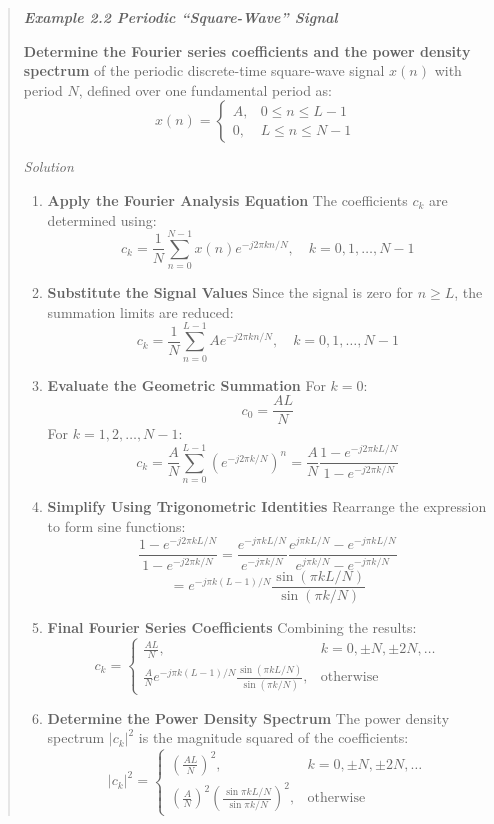 \begin{quote}
\textbf{\emph{Example 2.2 Periodic ``Square-Wave'' Signal}}

\textbf{Determine the Fourier series coefficients and the power density
spectrum} of the periodic discrete-time square-wave signal \(x(n)\) with
period \(N\), defined over one fundamental period as:
\[x(n) = \begin{cases} A, & 0 \leq n \leq L-1 \\ 0, & L \leq n \leq N-1 \end{cases}\]

\emph{Solution}

\begin{enumerate}
\def\labelenumi{\arabic{enumi}.}
\item
  \textbf{Apply the Fourier Analysis Equation} The coefficients \(c_k\)
  are determined using:
  \[c_k = \frac{1}{N} \sum_{n=0}^{N-1} x(n)e^{-j2\pi kn/N}, \quad k = 0, 1, \dots, N-1\]
\item
  \textbf{Substitute the Signal Values} Since the signal is zero for
  \(n \geq L\), the summation limits are reduced:
  \[c_k = \frac{1}{N} \sum_{n=0}^{L-1} Ae^{-j2\pi kn/N}, \quad k = 0, 1, \dots, N-1\]
\item
  \textbf{Evaluate the Geometric Summation} For \(k=0\):
  \[c_0 = \frac{AL}{N}\] For \(k = 1, 2, \dots, N-1\):
  \[c_k = \frac{A}{N} \sum_{n=0}^{L-1} (e^{-j2\pi k/N})^n = \frac{A}{N} \frac{1- e^{-j2\pi kL/N}}{1- e^{-j2\pi k/N}}\]
\item
  \textbf{Simplify Using Trigonometric Identities} Rearrange the
  expression to form sine functions:
  \[\frac{1- e^{-j2\pi kL/N}}{1- e^{-j2\pi k/N}} = \frac{e^{-j\pi kL/N}}{e^{-j\pi k/N}} \frac{e^{j\pi kL/N} - e^{-j\pi kL/N}}{e^{j\pi k/N} - e^{-j\pi k/N}}\]
  \[= e^{-j\pi k(L-1)/N} \frac{\sin(\pi kL/N)}{\sin(\pi k/N)}\]
\item
  \textbf{Final Fourier Series Coefficients} Combining the results:
  \[c_k = \begin{cases} \frac{AL}{N}, & k = 0, \pm N, \pm 2N, \dots \\ \frac{A}{N} e^{-j\pi k(L-1)/N} \frac{\sin(\pi kL/N)}{\sin(\pi k/N)}, & \text{otherwise} \end{cases}\]
\item
  \textbf{Determine the Power Density Spectrum} The power density
  spectrum \(|c_k|^2\) is the magnitude squared of the coefficients:
  \[|c_k|^2 = \begin{cases} \left( \frac{AL}{N} \right)^2, & k = 0, \pm N, \pm 2N, \dots \\ \left( \frac{A}{N} \right)^2 \left( \frac{\sin \pi kL/N}{\sin \pi k/N} \right)^2, & \text{otherwise} \end{cases}\]
\end{enumerate}
\end{quote}

